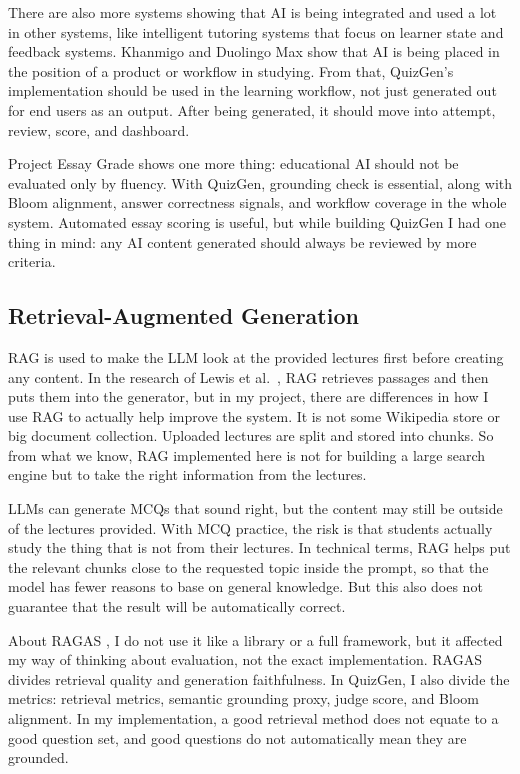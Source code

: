 \documentclass[12pt,a4paper]{article}
\begin{document}
There are also more systems showing that AI is being integrated and used a
lot in other systems, like intelligent tutoring systems
\cite{anderson1985its} that focus on learner state and feedback systems.
Khanmigo \cite{khanmigo2026} and Duolingo Max \cite{duolingo2023max} show
that AI is being placed in the position of a product or workflow in
studying. From that, QuizGen's implementation should be used in the learning
workflow, not just generated out for end users as an output. After being
generated, it should move into attempt, review, score, and dashboard.

Project Essay Grade \cite{springer2022aes} shows one more thing:
educational AI should not be evaluated only by fluency. With QuizGen,
grounding check is essential, along with Bloom alignment, answer correctness
signals, and workflow coverage in the whole system. Automated essay scoring
is useful, but while building QuizGen I had one thing in mind: any AI content
generated should always be reviewed by more criteria.

\subsection{Retrieval-Augmented Generation}

RAG is used to make the LLM look at the provided lectures first before
creating any content. In the research of Lewis et al.\ \cite{lewis2020rag},
RAG retrieves passages and then puts them into the generator, but in my
project, there are differences in how I use RAG to actually help improve the
system. It is not some Wikipedia store or big document collection. Uploaded
lectures are split and stored into chunks. So from what we know, RAG
implemented here is not for building a large search engine but to take the
right information from the lectures.

LLMs can generate MCQs that sound right, but the content may still be
outside of the lectures provided. With MCQ practice, the risk is that
students actually study the thing that is not from their lectures. In
technical terms, RAG helps put the relevant chunks close to the requested
topic inside the prompt, so that the model has fewer reasons to base on
general knowledge. But this also does not guarantee that the result will be
automatically correct.

About RAGAS \cite{es2023ragas}, I do not use it like a library or a full
framework, but it affected my way of thinking about evaluation, not the exact
implementation. RAGAS divides retrieval quality and generation faithfulness.
In QuizGen, I also divide the metrics: retrieval metrics, semantic grounding
proxy, judge score, and Bloom alignment. In my implementation, a good
retrieval method does not equate to a good question set, and good questions
do not automatically mean they are grounded.
\end{document}
